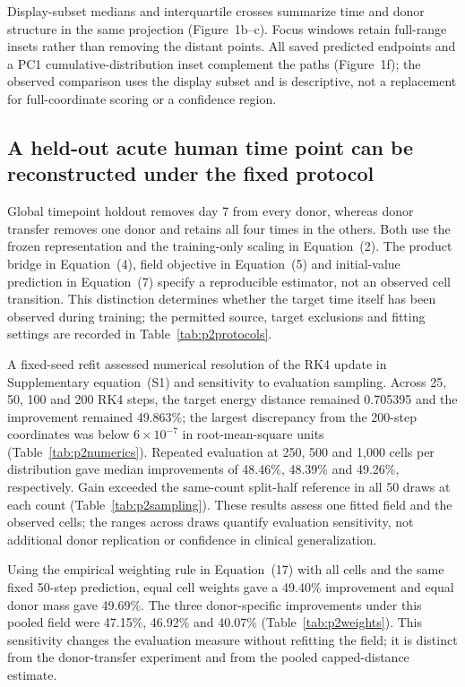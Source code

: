\documentclass[10pt,a4paper]{article}
\begin{document}
Display-subset medians and interquartile crosses summarize time and donor structure in the same projection (Figure~1b--c). Focus windows retain full-range insets rather than removing the distant points. All saved predicted endpoints and a PC1 cumulative-distribution inset complement the paths (Figure~1f); the observed comparison uses the display subset and is descriptive, not a replacement for full-coordinate scoring or a confidence region.

\subsection{A held-out acute human time point can be reconstructed under the fixed protocol}

Global timepoint holdout removes day 7 from every donor, whereas donor transfer removes one donor and retains all four times in the others. Both use the frozen representation and the training-only scaling in Equation~(2). The product bridge in Equation~(4), field objective in Equation~(5) and initial-value prediction in Equation~(7) specify a reproducible estimator, not an observed cell transition. This distinction determines whether the target time itself has been observed during training; the permitted source, target exclusions and fitting settings are recorded in Table~\ref{tab:p2protocols}.

A fixed-seed refit assessed numerical resolution of the RK4 update in Supplementary equation~(S1) and sensitivity to evaluation sampling. Across 25, 50, 100 and 200 RK4 steps, the target energy distance remained 0.705395 and the improvement remained 49.863\%; the largest discrepancy from the 200-step coordinates was below $6\times10^{-7}$ in root-mean-square units (Table~\ref{tab:p2numerics}). Repeated evaluation at 250, 500 and 1,000 cells per distribution gave median improvements of 48.46\%, 48.39\% and 49.26\%, respectively. Gain exceeded the same-count split-half reference in all 50 draws at each count (Table~\ref{tab:p2sampling}). These results assess one fitted field and the observed cells; the ranges across draws quantify evaluation sensitivity, not additional donor replication or confidence in clinical generalization.

Using the empirical weighting rule in Equation~(17) with all cells and the same fixed 50-step prediction, equal cell weights gave a 49.40\% improvement and equal donor mass gave 49.69\%. The three donor-specific improvements under this pooled field were 47.15\%, 46.92\% and 40.07\% (Table~\ref{tab:p2weights}). This sensitivity changes the evaluation measure without refitting the field; it is distinct from the donor-transfer experiment and from the pooled capped-distance estimate.
\end{document}
